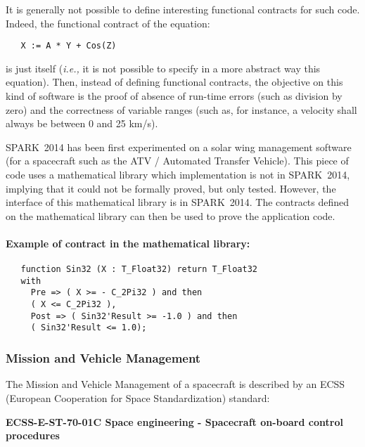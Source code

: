 \documentclass[10pt,a4paper,twocolumn]{article}
\newcommand{\newspark}{SPARK~2014\xspace}
\newcommand{\ie}{\textit{i.e.,}\xspace}
\begin{document}
It is generally not possible to define interesting functional contracts for such code. Indeed, the functional contract of the equation:

\begin{verbatim}
   X := A * Y + Cos(Z)
\end{verbatim}

\noindent
is just itself (\ie it is not possible to specify in a more abstract way this equation). Then, instead of defining functional contracts, the objective on this kind of software is the proof of absence of run-time errors (such as division by zero) and the correctness of variable ranges (such as, for instance, a velocity shall always be between 0 and 25 km/s).
\fi

\newspark has been first experimented on a solar wing management software (for a spacecraft such as the ATV / Automated Transfer Vehicle).
This piece of code uses a mathematical library which implementation is not in \newspark, implying that it could not be formally proved, but only tested. However, the interface of this mathematical library is in \newspark. The contracts defined on the mathematical library can then be used to prove the application code.

\ifdefined\abstractonly
\else
\paragraph{Example of contract in the mathematical library:}

\begin{verbatim}
   function Sin32 (X : T_Float32) return T_Float32
   with
     Pre => ( X >= - C_2Pi32 ) and then
     ( X <= C_2Pi32 ),
     Post => ( Sin32'Result >= -1.0 ) and then
     ( Sin32'Result <= 1.0);
\end{verbatim}
\fi

\subsubsection{Mission and Vehicle Management}

The Mission and Vehicle Management of a spacecraft is described by an ECSS (European Cooperation for Space Standardization) standard:

\begin{center}
{\bf ECSS-E-ST-70-01C Space engineering - Spacecraft on-board control procedures}
\end{center}
\end{document}
